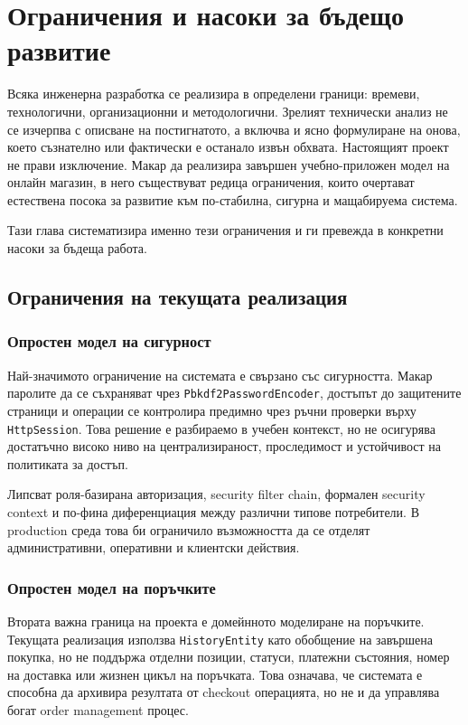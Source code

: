 \section{Ограничения и насоки за бъдещо развитие}

Всяка инженерна разработка се реализира в определени граници: времеви, технологични, организационни и методологични. Зрелият технически анализ не се изчерпва с описване на постигнатото, а включва и ясно формулиране на онова, което съзнателно или фактически е останало извън обхвата. Настоящият проект не прави изключение. Макар да реализира завършен учебно-приложен модел на онлайн магазин, в него съществуват редица ограничения, които очертават естествена посока за развитие към по-стабилна, сигурна и мащабируема система.

Тази глава систематизира именно тези ограничения и ги превежда в конкретни насоки за бъдеща работа.

\subsection{Ограничения на текущата реализация}

\subsubsection{Опростен модел на сигурност}

Най-значимото ограничение на системата е свързано със сигурността. Макар паролите да се съхраняват чрез \texttt{Pbkdf2PasswordEncoder}, достъпът до защитените страници и операции се контролира предимно чрез ръчни проверки върху \texttt{HttpSession}. Това решение е разбираемо в учебен контекст, но не осигурява достатъчно високо ниво на централизираност, проследимост и устойчивост на политиката за достъп.

Липсват роля-базирана авторизация, security filter chain, формален security context и по-фина диференциация между различни типове потребители. В production среда това би ограничило възможността да се отделят административни, оперативни и клиентски действия.

\subsubsection{Опростен модел на поръчките}

Втората важна граница на проекта е домейнното моделиране на поръчките. Текущата реализация използва \texttt{HistoryEntity} като обобщение на завършена покупка, но не поддържа отделни позиции, статуси, платежни състояния, номер на доставка или жизнен цикъл на поръчката. Това означава, че системата е способна да архивира резултата от checkout операцията, но не и да управлява богат order management процес.

